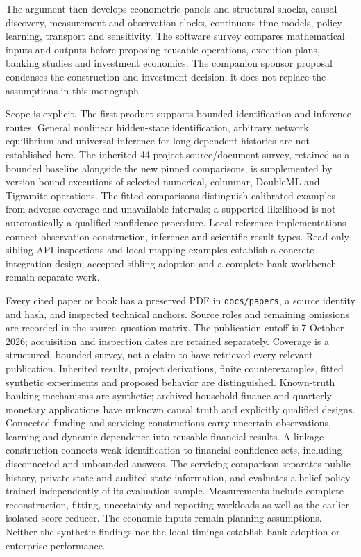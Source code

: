 \documentclass[11pt,a4paper,openany]{book}
\begin{document}
The argument then develops econometric panels and structural shocks,
causal discovery, measurement and observation clocks, continuous-time
models, policy learning, transport and sensitivity. The software survey
compares mathematical inputs and outputs before proposing reusable
operations, execution plans, banking studies and investment economics.
The companion sponsor proposal condenses the construction and investment
decision; it does not replace the assumptions in this monograph.

Scope is explicit. The first product supports bounded identification and
inference routes. General nonlinear hidden-state identification, arbitrary
network equilibrium and universal inference for long dependent histories
are not established here. The inherited 44-project source/document survey, retained as a bounded
baseline alongside the new pinned comparisons, is supplemented
by version-bound executions of selected numerical, columnar, DoubleML and
Tigramite operations. The fitted comparisons distinguish calibrated examples
from adverse coverage and unavailable intervals; a supported likelihood is
not automatically a qualified confidence procedure.
Local reference implementations connect observation construction, inference
and scientific result types. Read-only sibling API inspections and local
mapping examples establish a concrete integration design; accepted sibling
adoption and a complete bank workbench remain separate work.

Every cited paper or book has a preserved PDF in \texttt{docs/papers}, a
source identity and hash, and inspected technical anchors. Source roles and
remaining omissions are recorded in the source--question matrix. The
publication cutoff is 7 October 2026; acquisition and inspection dates
are retained separately. Coverage is a structured, bounded survey, not a
claim to have retrieved every relevant publication. Inherited results,
project derivations, finite counterexamples, fitted synthetic experiments
and proposed behavior are distinguished. Known-truth banking mechanisms are
synthetic; archived household-finance and quarterly monetary applications
have unknown causal truth and explicitly qualified designs. Connected funding
and servicing constructions carry uncertain observations, learning and
dynamic dependence into reusable financial results. A linkage construction connects weak identification to
financial confidence sets, including disconnected and unbounded answers.
The servicing comparison
separates public-history, private-state and audited-state information, and
evaluates a belief policy trained independently of its evaluation sample. Measurements include complete reconstruction, fitting,
uncertainty and reporting workloads as well as the earlier isolated score
reducer. The economic inputs remain planning assumptions. Neither the
synthetic findings nor the local timings establish bank adoption or
enterprise performance.
\end{document}
